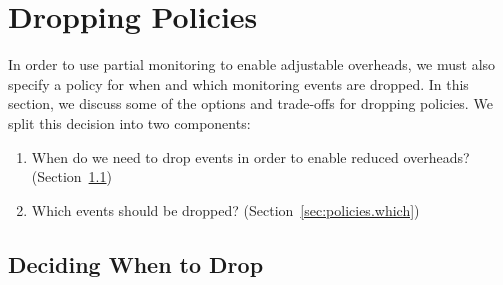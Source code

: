 \section{Dropping Policies}
\label{sec:policies}

In order to use partial monitoring to enable adjustable overheads, we must also
specify a policy for when and which monitoring events are dropped. In this
section, we discuss some of the options and trade-offs for dropping policies.
We split this decision into two components:
\begin{enumerate}
  \item When do we need to drop events in order to enable reduced overheads? (Section~\ref{sec:policies.when})
  \item Which events should be dropped? (Section~\ref{sec:policies.which})
\end{enumerate}


\subsection{Deciding When to Drop}
\label{sec:policies.when}

